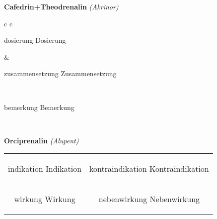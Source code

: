 \documentclass[12pt]{beamer}
\begin{document}
\begin{frame}{
    \textbf{Cafedrin+Theodrenalin}
    \textit{(Akrinor)}
}
    \begin{tabular}{c c}
        \begin{beamercolorbox}[wd=\boxwidth\textwidth,ht=\boxheight\textheight,sep=1em]{dosierung}
        Dosierung
        \end{beamercolorbox} & 
        \begin{beamercolorbox}[wd=\boxwidth\textwidth,ht=\boxheight\textheight,sep=1em]{zusammensetzung}
        Zusammensetzung
        \end{beamercolorbox} \\
        \begin{beamercolorbox}[wd=\textwidth,ht=\boxheight\textheight,sep=1em]{bemerkung}
        Bemerkung
        \end{beamercolorbox} \\
    \end{tabular}
\end{frame}

\begin{frame}{
    \textbf{Orciprenalin}
    \textit{(Alupent)}
}
    \begin{tabular}{c c}
        \begin{beamercolorbox}[wd=\boxwidth\textwidth,ht=\boxheight\textheight,sep=1em]{indikation}
        Indikation
        \end{beamercolorbox} & 
        \begin{beamercolorbox}[wd=\boxwidth\textwidth,ht=\boxheight\textheight,sep=1em]{kontraindikation}
        Kontraindikation 
        \end{beamercolorbox} \\
        \begin{beamercolorbox}[wd=\boxwidth\textwidth,ht=\boxheight\textheight,sep=1em]{wirkung}
        Wirkung
        \end{beamercolorbox} & 
        \begin{beamercolorbox}[wd=\boxwidth\textwidth,ht=\boxheight\textheight,sep=1em]{nebenwirkung}
        Nebenwirkung
        \end{beamercolorbox} \\
    \end{tabular}
\end{frame}
\end{document}
